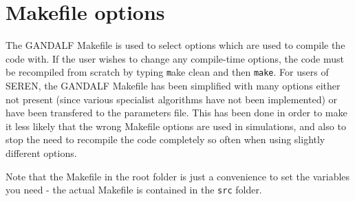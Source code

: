 \documentclass[a4paper]{article}
\newcommand{\var}[1]{\texttt{#1}}
\begin{document}
\newpage

\section{Makefile options} \label{S:MAKEFILE}
The GANDALF Makefile is used to select options which are used to compile the code with.  If the user wishes to change any compile-time options, the code must be recompiled from scratch by typing {\var make clean} and then \var{make}.  For users of SEREN, the GANDALF Makefile has been simplified with many options either not present (since various specialist algorithms have not been implemented) or have been transfered to the parameters file.  This has been done in order to make it less likely that the wrong Makefile options are used in simulations, and also to stop the need to recompile the code completely so often when using slightly different options.

Note that the Makefile in the root folder is just a convenience to set the variables you need - the actual Makefile is contained in the \var{src} folder.
\end{document}
